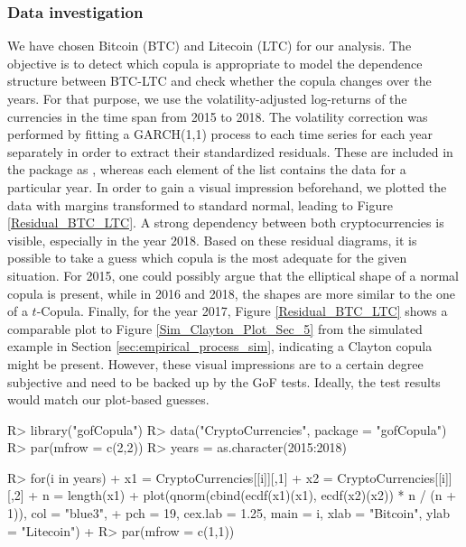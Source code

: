 \subsubsection{Data investigation}
We have chosen Bitcoin (BTC) and Litecoin (LTC) for our analysis. The objective is to detect which copula is appropriate to model the dependence structure between BTC-LTC and check whether the copula changes over the years. For that purpose, we use the volatility-adjusted log-returns of the currencies in the time span from 2015 to 2018. The volatility correction was performed by fitting a GARCH(1,1) process to each time series for each year separately in order to extract their standardized residuals. These are included in the package as , whereas each element of the list contains the data for a particular year. In order to gain a visual impression beforehand, we plotted the data with margins transformed to standard normal, leading to Figure \ref{Residual_BTC_LTC}. A strong dependency between both cryptocurrencies is visible, especially in the year 2018. Based on these residual diagrams, it is possible to take a guess which copula is the most adequate for the given situation. For 2015, one could possibly argue that the elliptical shape of a normal copula is present, while in 2016 and 2018, the shapes are more similar to the one of a $t$-Copula. Finally, for the year 2017, Figure \ref{Residual_BTC_LTC} shows a comparable plot to Figure \ref{Sim_Clayton_Plot_Sec_5} from the simulated example in Section \ref{sec:empirical_process_sim}, indicating a Clayton copula might be present. However, these visual impressions are to a certain degree subjective and need to be backed up by the GoF tests. Ideally, the test results would match our plot-based guesses.
\mycolor
\begin{example}
R> library("gofCopula")
R> data("CryptoCurrencies", package = "gofCopula")
R> par(mfrow = c(2,2))
R> years = as.character(2015:2018)

R> for(i in years){
+     x1 = CryptoCurrencies[[i]][,1]
+     x2 = CryptoCurrencies[[i]][,2]
+      n = length(x1)
+     plot(qnorm(cbind(ecdf(x1)(x1), ecdf(x2)(x2)) * n / (n + 1)), col = "blue3",
+          pch = 19, cex.lab = 1.25, main = i, xlab = "Bitcoin", ylab = "Litecoin")
+  }
R> par(mfrow = c(1,1))
\end{example}
\bk
